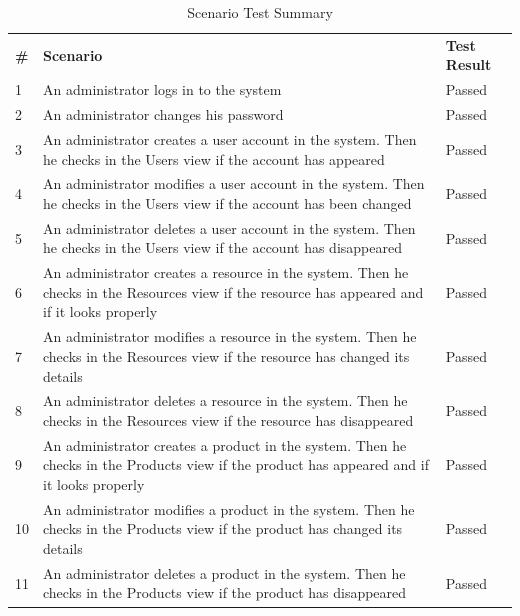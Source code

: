 \documentclass[a4paper,11pt,twoside]{report}
\theoremstyle{definition}
\begin{document}
\begin{longtable}{|p{1cm}|p{11cm}|p{4cm}|}
\caption[Scenario Test Summary]{Scenario Test Summary}
\label{Scenario Test Summary}
\centering
\tabularnewline

\hline
\textbf{\#} & \textbf{Scenario} & \textbf{Test Result} \\ \hline
1 & An administrator logs in to the system & Passed \\ \hline
2 & An administrator changes his password & Passed \\ \hline
3 & An administrator creates a user account in the system. Then he checks in the Users view if the account has appeared & Passed \\ \hline
4 & An administrator modifies a user account in the system. Then he checks in the Users view if the account has been changed & Passed \\ \hline
5 & An administrator deletes a user account in the system. Then he checks in the Users view if the account has disappeared & Passed \\ \hline
6 & An administrator creates a resource in the system. Then he checks in the Resources view if the resource has appeared and if it looks properly & Passed \\ \hline
7 & An administrator modifies a resource in the system. Then he checks in the Resources view if the resource has changed its details & Passed \\ \hline
8 & An administrator deletes a resource in the system. Then he checks in the Resources view if the resource has disappeared & Passed \\ \hline
9 & An administrator creates a product in the system. Then he checks in the Products view if the product has appeared and if it looks properly & Passed \\ \hline
10 & An administrator modifies a product in the system. Then he checks in the Products view if the product has changed its details & Passed \\ \hline
11 & An administrator deletes a product in the system. Then he checks in the Products view if the product has disappeared & Passed \\ \hline


\end{longtable}
\end{document}
